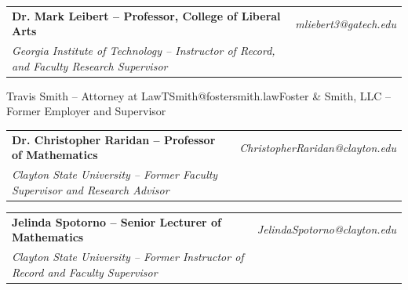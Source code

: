 \documentclass[letterpaper,11pt]{article}
\makeatletter
\newcommand{\resumeOrganizationHeading}[4]{
  \vspace{-2pt}\item
    \begin{tabular*}{\textwidth}[t]{l@{\extracolsep{\fill}}r}
      \textbf{#1} & \textit{\small #2} \\
      \textit{\small#3}
    \end{tabular*}\vspace{-7pt}
}
\newcommand{\resumeSubHeadingListEnd}{\end{itemize}}
\makeatother
\begin{document}
    \resumeOrganizationHeading
    {Dr. Mark Leibert -- Professor, College of Liberal Arts}{mliebert3@gatech.edu}{Georgia Institute of Technology -- Instructor of Record, and Faculty Research Supervisor}
  
    \resumeOrganizationHeading
    {Travis Smith -- Attorney at Law}{TSmith@fostersmith.law}{Foster \& Smith, LLC -- Former Employer and Supervisor}

    \resumeOrganizationHeading
    {Dr. Christopher Raridan -- Professor of Mathematics}{ChristopherRaridan@clayton.edu}{Clayton State University -- Former Faculty Supervisor and Research Advisor}{Clayton State University}
  
    \resumeOrganizationHeading
    {Jelinda Spotorno -- Senior Lecturer of Mathematics}
    {JelindaSpotorno@clayton.edu}{Clayton State University -- Former Instructor of Record and Faculty Supervisor}
      
  \resumeSubHeadingListEnd



\end{document}
